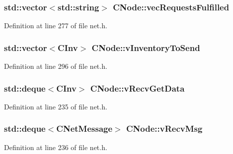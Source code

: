 \subsubsection[{vec\+Requests\+Fulfilled}]{\setlength{\rightskip}{0pt plus 5cm}std\+::vector$<$std\+::string$>$ C\+Node\+::vec\+Requests\+Fulfilled\hspace{0.3cm}{\ttfamily [protected]}}\label{class_c_node_a212cf268fdb1903f61993319175f023e}


Definition at line 277 of file net.\+h.

\hypertarget{class_c_node_abcd24c9478bc1ab5ba6de6b369080cec}{}
\subsubsection[{v\+Inventory\+To\+Send}]{\setlength{\rightskip}{0pt plus 5cm}std\+::vector$<${\bf C\+Inv}$>$ C\+Node\+::v\+Inventory\+To\+Send}\label{class_c_node_abcd24c9478bc1ab5ba6de6b369080cec}


Definition at line 296 of file net.\+h.

\hypertarget{class_c_node_a9649c1f27ff0d8f0ba89eb1ea5bee139}{}
\subsubsection[{v\+Recv\+Get\+Data}]{\setlength{\rightskip}{0pt plus 5cm}std\+::deque$<${\bf C\+Inv}$>$ C\+Node\+::v\+Recv\+Get\+Data}\label{class_c_node_a9649c1f27ff0d8f0ba89eb1ea5bee139}


Definition at line 235 of file net.\+h.

\hypertarget{class_c_node_a015361812daa5b6ebb9a5692ddf67a54}{}
\subsubsection[{v\+Recv\+Msg}]{\setlength{\rightskip}{0pt plus 5cm}std\+::deque$<${\bf C\+Net\+Message}$>$ C\+Node\+::v\+Recv\+Msg}\label{class_c_node_a015361812daa5b6ebb9a5692ddf67a54}


Definition at line 236 of file net.\+h.

\hypertarget{class_c_node_a68e5fb1a80fe4247aa577a3c9a74b399}{}

